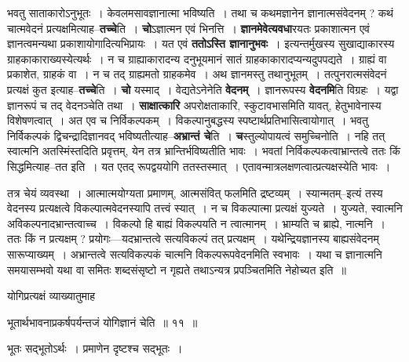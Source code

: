 \documentclass[article,12pt,a4paper]{memoir}
\begin{document}
	  \pstart भवतु साताकारोऽनुभूतः । केवलमसावज्ञानात्मा भविष्यति । तथा च कथमज्ञानेन ज्ञानात्मसंवेदनम् ? कथं चात्मवेदनं प्रत्यक्षमित्याह--\textbf{तच्चे}ति । \textbf{चो}ऽज्ञात्मन एवं भिनत्ति । \textbf{ज्ञानमेवेत्यवधा}रयतः प्रकाशात्मन एवं ज्ञानत्वमन्यथा प्रकाशायोगादित्यभिप्रायः । यत एवं \textbf{ततोऽस्ति ज्ञानानुभवः} । इत्यन्तर्मुखस्य सुखाद्याकारस्य ग्राहकाकाराख्यस्येत्यर्थः । न च ग्राह्याकारादन्य दनुभूयमानं सातं ग्राहकाकारादप्यन्यदुपपद्यते । ग्राह्यं वा प्रकाशेत, ग्राहकं वा । न च तद् ग्राह्यमतो ग्राहकमेव । अथ ज्ञानमस्तु तथानुभूतम् । तत्पुनरात्मसंवेदनं प्रत्यक्षं कुत इत्याह--\textbf{तच्चे}ति । \textbf{चो} यस्माद् । वेद्यतेऽनेनेति \textbf{वेदनम्} । ज्ञानरूपस्य \textbf{वेदनमि}ति विग्रहः\leavevmode{} । यद्वा ज्ञानरूपं च तद् वेदनञ्चेति तथा । \textbf{साक्षात्कारि} अपरोक्षताकारि, स्कुटावभासमिति यावत्, हेतुभावेनास्य विशेषणत्वात् । अत एव च निर्विकल्पकम् । विकल्पानुबद्धस्य स्पष्टार्थप्रतिभासित्वायोगात् । भवतु निर्विकल्पकं द्विचन्द्रादिज्ञानवद् भविष्यतीत्याह--\textbf{अभ्रान्तं चे}ति । \textbf{च}स्तुल्योपायत्वं समुच्चिनोति । नहि तत् स्वात्मनि अतस्मिंस्तदिति प्रवृत्तम्, येन तत्र भ्रान्तिर्भविष्यतीति भावः । भवतां निर्विकल्पकत्वाभ्रान्तत्वे ततः किं सिद्धमित्याह--तत इति । यत एतद् रूपद्वययोगि ततस्तस्मात् । एतावन्मात्रलक्षणत्वात्प्रत्यक्षस्येति भावः ।
	\pend
      

	  \pstart तत्र चेयं व्यवस्था । आत्मात्मयोग्यता प्रमाणम्, आत्मसंवित् फलमिति द्रष्टव्यम् । स्यान्मतम्--इत्यं तस्य वेदनस्य प्रत्यक्षत्वे विकल्पात्मवेदनस्यापि तत्त्वं स्यात् । न च विकल्पात्मा प्रत्यक्षं युज्यते । युज्यते, स्वात्मनि अविकल्पनादभ्रान्तत्वाच्च । विकल्पो हि बाह्यं विकल्पयति न त्वात्मानम् । भ्राम्यति च ब्राह्ये, नात्मनि । ततः किं न प्रत्यक्षम् ? प्रयोगः—यदभ्रान्तत्वे सत्यविकल्पं तत् प्रत्यक्षम् । यथेन्द्रियज्ञानस्य बाह्यसंवेदनम् सारूप्याख्यम् । अभ्रान्तत्वे सत्यविकल्पकं चात्मनि विकल्परूपवेदनमिति स्वभावः । यथा च ज्ञानात्मनि समयासम्भवो यथा वा समितः शब्दसंसृष्टो न गृह्यते तथाऽन्यत्र प्रपञ्चितमिति नेहोच्यत इति ॥
	\pend
	  \bigskip
	  \begingroup
	

	  \pstart योगिप्रत्यक्षं व्याख्यातुमाह
	\pend
      
	  \endgroup
	
	  \bigskip
	  \begingroup
	

	  \pstart भूतार्थभावनाप्रकर्षपर्यन्तजं योगिज्ञानं चेति ॥ ११ ॥
	\pend
      
	  \endgroup
	

	  \pstart भूतः सद्भूतोऽर्थः । प्रमाणेन दृष्टश्च सद्भूतः ।
	\pend
      
\end{document}
